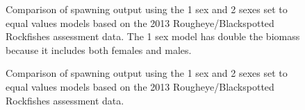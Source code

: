 \documentclass[
]{scrartcl}
\begin{document}
\begin{figure}[H]


\caption{\label{fig-Sex1vs2_SO}Comparison of spawning output using the 1
sex and 2 sexes set to equal values models based on the 2013
Rougheye/Blackspotted Rockfishes assessment data. The 1 sex model has
double the biomass because it includes both females and males.}

\end{figure}%

\begin{figure}[H]


\caption{\label{fig-Sex1vs2_Bratio}Comparison of spawning output using
the 1 sex and 2 sexes set to equal values models based on the 2013
Rougheye/Blackspotted Rockfishes assessment data.}

\end{figure}%
\end{document}
